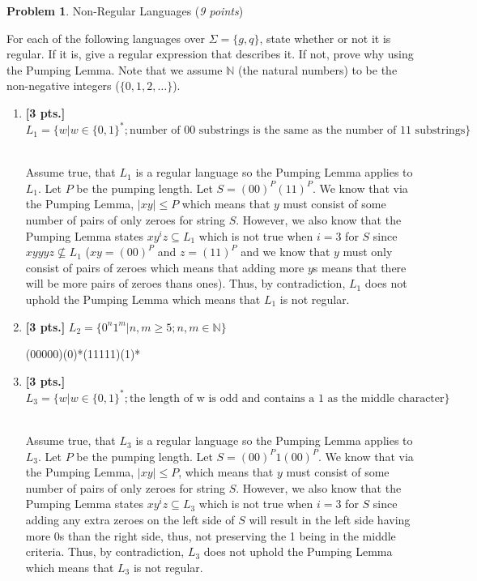 \documentclass[11pt]{article}
\theoremstyle{definition}
\theoremstyle{theorem}
\newtheorem{prob}{Problem}
\newcommand{\solution}{\medskip\noindent{\color{blue}\textbf{Solution:}}}
\begin{document}
\newpage

\begin{prob} Non-Regular Languages (\emph{9 points})\end{prob}

For each of the following languages over $\Sigma = \{g, q\}$, state whether or not it is regular. If it is, give a regular expression that describes it. If not, prove why using the Pumping Lemma. Note that we assume $\mathbb{N}$ (the natural numbers) to be the non-negative integers ($\{0, 1, 2, \dots\}$).

\begin{enumerate}[label=(\alph*)]



\item \textbf{[3 pts.]}  $L_1 = \{w |  w\in \{0,1\}^*; \text{number of 00 substrings is the same as the number of 11 substrings}\}$

\solution 
\\ Assume true, that $L_1$ is a regular language so the Pumping Lemma applies to $L_1$. Let $P$ be the pumping length. Let $S = (00)^P(11)^P$. We know that via the Pumping Lemma, $\left\lvert xy \right\rvert \leq P$
which means that $y$ must consist of some number of pairs of only zeroes for string $S$. However, we also know that the Pumping Lemma states $xy^iz \subseteq L_1$ which is not true when $i = 3$ for $S$ since $xyyyz \nsubseteq L_1$ ($xy = (00)^P$ and $z = (11)^P$ and we know that $y$ must only consist of pairs of zeroes which means that adding more $y$s means that there will be more pairs of zeroes thans ones). Thus, by contradiction, $L_1$ does not uphold the Pumping Lemma which means that $L_1$ is not regular.

\item \textbf{[3 pts.]}  $L_2 = \{0^n1^m | n,m \geq 5; n,m \in \mathbb{N}\}$

\solution 

(00000)(0)*(11111)(1)*

\item \textbf{[3 pts.]}  $L_3 = \{w |  w\in \{0,1\}^*; \text{the length of w is odd and contains a 1 as the middle character}\}$

\solution 
\\ Assume true, that $L_3$ is a regular language so the Pumping Lemma applies to $L_3$. Let $P$ be the pumping length. Let $S = (00)^P1(00)^P$. We know that via the Pumping Lemma, $\left\lvert xy \right\rvert \leq P$, which means that $y$ must consist of some number of pairs of only zeroes for string $S$. However, we also know that the Pumping Lemma states $xy^iz \subseteq L_3$ which is not true when $i = 3$ for $S$ since adding any extra zeroes on the left side of $S$ will result in the left side having more 0s than the right side, thus, not preserving the 1 being in the middle criteria. Thus, by contradiction, $L_3$ does not uphold the Pumping Lemma which means that $L_3$ is not regular.

\end{enumerate}
\end{document}
